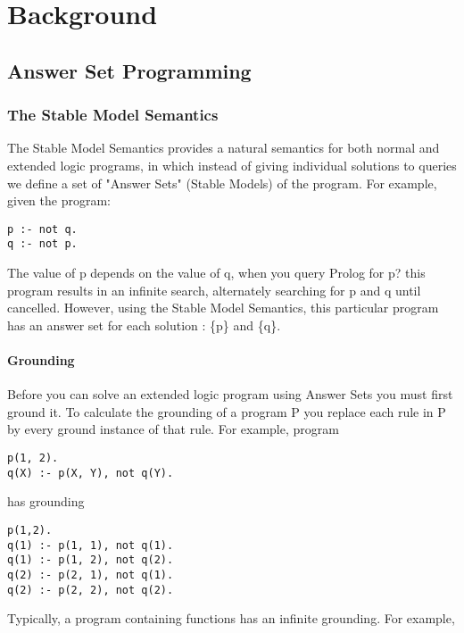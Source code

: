 \chapter{Background}

\section{Answer Set Programming}

\subsection{The Stable Model Semantics}

The Stable Model Semantics provides a natural semantics for both normal and extended logic programs, in which instead of giving individual solutions to queries we define a set of "Answer Sets" (Stable Models) of the program. For example, given the program:

\begin{lstlisting}
p :- not q.
q :- not p.
\end{lstlisting}

The value of p depends on the value of q, when you query Prolog for p? this program results in an infinite search, alternately searching for p and q until cancelled. However, using the Stable Model Semantics, this particular program has an answer set for each solution : \{p\} and \{q\}.

\subsubsection{Grounding}

Before you can solve an extended logic program using Answer Sets you must first ground it. To calculate the grounding of a program P you replace each rule in P by every ground instance of that rule. For example, program 

\begin{lstlisting}
p(1, 2).
q(X) :- p(X, Y), not q(Y).
\end{lstlisting}

has grounding

\begin{lstlisting}
p(1,2).
q(1) :- p(1, 1), not q(1).
q(1) :- p(1, 2), not q(2).
q(2) :- p(2, 1), not q(1).
q(2) :- p(2, 2), not q(2).
\end{lstlisting}

Typically, a program containing functions has an infinite grounding. For example, 

